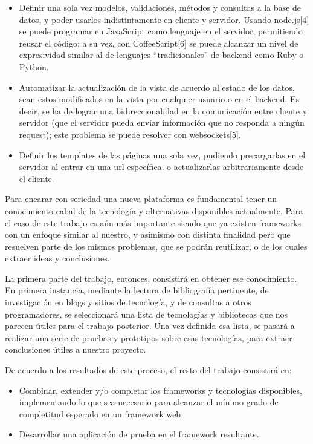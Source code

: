 \documentclass[doc,helv,longtable]{article}
\begin{document}
\begin{itemize}
\item  Definir una sola vez modelos, validaciones, métodos y consultas a la base de datos, y poder usarlos indistintamente en cliente y servidor. Usando node.js[4] se puede programar en JavaScript como lenguaje en el servidor, permitiendo reusar el código; a su vez, con CoffeeScript[6] se puede alcanzar un nivel de expresividad similar al de lenguajes “tradicionales” de backend como Ruby o Python.
\item  Automatizar la actualización de la vista de acuerdo al estado de los datos, sean estos modificados en la vista por cualquier usuario o en el backend. Es decir, se ha de lograr una bidireccionalidad en la comunicación entre cliente y servidor (que el servidor pueda enviar información que no responda a ningún request); este problema se puede resolver con websockets[5].
\item  Definir los templates de las páginas una sola vez, pudiendo precargarlas en el servidor al entrar en una url específica, o actualizarlas arbitrariamente desde el cliente.

\end{itemize}


Para encarar con seriedad una nueva plataforma es fundamental tener un conocimiento cabal de la tecnología y alternativas disponibles actualmente. Para el caso de este trabajo es aún más importante siendo que ya existen frameworks con un enfoque similar al nuestro, y asimismo con distinta finalidad pero que resuelven parte de los mismos problemas, que se podrán reutilizar, o de los cuales extraer ideas y conclusiones. 

La primera parte del trabajo, entonces, consistirá en obtener ese conocimiento. En primera instancia, mediante la lectura de bibliografía pertinente, de investigación en blogs y sitios de tecnología, y de consultas a otros programadores, se seleccionará una lista de tecnologías y bibliotecas que nos parecen útiles para el trabajo posterior. Una vez definida esa lista, se pasará a realizar una serie de pruebas y prototipos sobre esas tecnologías, para extraer conclusiones útiles a nuestro proyecto.

De acuerdo a los resultados de este proceso, el resto del trabajo consistirá en:
\begin{itemize}
\item  Combinar, extender y/o completar los frameworks y tecnologías disponibles, implementando lo que sea necesario para alcanzar el mínimo grado de completitud esperado en un framework web.  
\item  Desarrollar una aplicación de prueba en el framework resultante.

\end{itemize}
\end{document}
